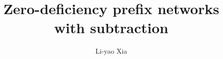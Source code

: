 \documentclass[11pt]{article}
\begin{document}
\title{Zero-deficiency prefix networks with subtraction}

\author{Li-yao Xia}%

\maketitle



\newpage



\end{document}
